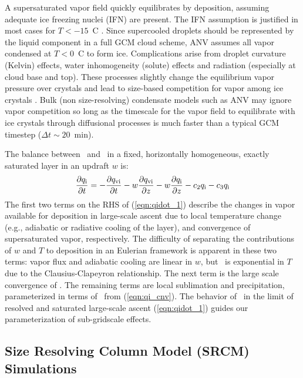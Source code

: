 \documentclass[twoside,agums]{aguplus}
\begin{document}
A supersaturated vapor field quickly equilibrates by deposition,
assuming adequate ice freezing nuclei (IFN) are present.
The IFN assumption is justified in most cases for $T < -15$~\dgr C  
\cite[]{HeD90}.
Since supercooled droplets should be represented by the liquid
component in a full GCM cloud scheme, ANV assumes all vapor condensed
at $T < 0$~\dgr C to form ice.
Complications arise from droplet curvature (Kelvin) effects, water
inhomogeneity (solute) effects and radiation (especially at cloud base
and top).
These processes slightly change the equilibrium vapor pressure over
crystals and lead to size-based competition for vapor among ice
crystals \cite[]{RaD86}.
Bulk (non size-resolving) condensate models such as ANV may ignore
vapor competition so long as the timescale for the vapor field to
equilibrate with ice crystals through diffusional processes is much
faster than a typical GCM timestep ($\Delta t \sim 20$~min). 

The balance between \qi\ and \qv\ in a fixed, horizontally
homogeneous, exactly saturated layer in an updraft $w$ is: 
\begin{equation}
{\partial \qi \over \partial t} = 
-{\partial \qvi \over \partial t} 
-w{\partial \qvi \over \partial z} 
-w{\partial \qi \over \partial z}
- c_2\qi 
- c_3\qi 
\label{eqn:qidot_1}
\end{equation}
The first two terms on the RHS of (\ref{eqn:qidot_1}) describe the
changes in vapor available for deposition in large-scale ascent due
to local temperature change (e.g., adiabatic or radiative cooling of
the layer), and convergence of supersaturated vapor, respectively.
The difficulty of separating the contributions of $w$ and $T$ to
deposition in an Eulerian framework is apparent in these two terms: 
vapor flux and adiabatic cooling are linear in $w$, but \qvi\ is 
exponential in $T$ due to the Clausius-Clapeyron relationship.
The next term is the large scale convergence of \qi.
The remaining terms are local sublimation and precipitation,
parameterized in terms of \qi\ from (\ref{eqn:qi_cnv}).
The behavior of \qidot\ in the limit of resolved and
saturated large-scale ascent (\ref{eqn:qidot_1}) guides
our parameterization of sub-gridscale effects. 

\subsection{Size Resolving Column Model (SRCM) Simulations}
\end{document}
